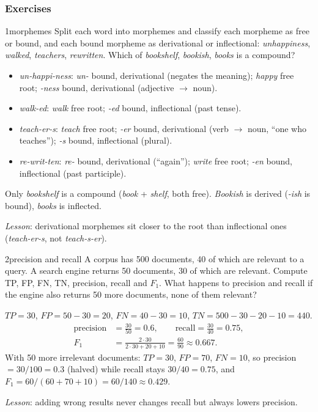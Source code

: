 \subsubsection{Exercises}
\notinslides

\begin{nbexercise}{1}{morphemes}
Split each word into morphemes and classify each morpheme as free or bound, and each
bound morpheme as derivational or inflectional: \emph{unhappiness}, \emph{walked},
\emph{teachers}, \emph{rewritten}. Which of \emph{bookshelf}, \emph{bookish},
\emph{books} is a compound?
\end{nbexercise}
\begin{nbsolution}
\begin{itemize}[nosep]
  \item \emph{un-happi-ness}: \emph{un-} bound, derivational (negates the meaning);
        \emph{happy} free root; \emph{-ness} bound, derivational (adjective $\to$ noun).
  \item \emph{walk-ed}: \emph{walk} free root; \emph{-ed} bound, inflectional (past tense).
  \item \emph{teach-er-s}: \emph{teach} free root; \emph{-er} bound, derivational
        (verb $\to$ noun, ``one who teaches''); \emph{-s} bound, inflectional (plural).
  \item \emph{re-writ-ten}: \emph{re-} bound, derivational (``again''); \emph{write}
        free root; \emph{-en} bound, inflectional (past participle).
\end{itemize}
Only \emph{bookshelf} is a compound (\emph{book} + \emph{shelf}, both free).
\emph{Bookish} is derived (\emph{-ish} is bound), \emph{books} is inflected.

\emph{Lesson}: derivational morphemes sit closer to the root than inflectional ones
(\emph{teach-er-s}, not \emph{teach-s-er}).
\end{nbsolution}

\begin{nbexercise}{2}{precision and recall}
A corpus has 500 documents, 40 of which are relevant to a query. A search engine
returns 50 documents, 30 of which are relevant. Compute TP, FP, FN, TN, precision,
recall and $F_1$. What happens to precision and recall if the engine also returns 50 more
documents, none of them relevant?
\end{nbexercise}
\begin{nbsolution}
$TP = 30$, $FP = 50 - 30 = 20$, $FN = 40 - 30 = 10$, $TN = 500 - 30 - 20 - 10 = 440$.
\begin{align*}
  \text{precision} &= \frac{30}{50} = 0.6, \qquad
  \text{recall} = \frac{30}{40} = 0.75, \\
  F_1 &= \frac{2\cdot 30}{2\cdot 30 + 20 + 10} = \frac{60}{90} \approx 0.667.
\end{align*}
With 50 more irrelevant documents: $TP = 30$, $FP = 70$, $FN = 10$, so
precision $= 30/100 = 0.3$ (halved) while recall stays $30/40 = 0.75$, and
$F_1 = 60/(60+70+10) = 60/140 \approx 0.429$.

\emph{Lesson}: adding wrong results never changes recall but always lowers precision.
\end{nbsolution}

